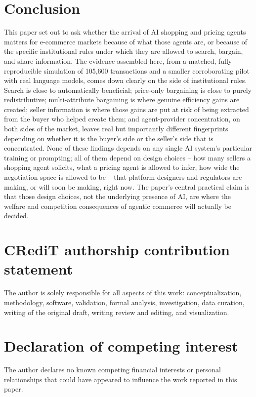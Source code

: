 \documentclass[review]{elsarticle}
\begin{document}
\section{Conclusion}
\label{sec:conclusion}

This paper set out to ask whether the arrival of AI shopping and pricing agents matters for e-commerce markets because of what those agents are, or because of the specific institutional rules under which they are allowed to search, bargain, and share information. The evidence assembled here, from a matched, fully reproducible simulation of 105,600 transactions and a smaller corroborating pilot with real language models, comes down clearly on the side of institutional rules. Search is close to automatically beneficial; price-only bargaining is close to purely redistributive; multi-attribute bargaining is where genuine efficiency gains are created; seller information is where those gains are put at risk of being extracted from the buyer who helped create them; and agent-provider concentration, on both sides of the market, leaves real but importantly different fingerprints depending on whether it is the buyer's side or the seller's side that is concentrated. None of these findings depends on any single AI system's particular training or prompting; all of them depend on design choices -- how many sellers a shopping agent solicits, what a pricing agent is allowed to infer, how wide the negotiation space is allowed to be -- that platform designers and regulators are making, or will soon be making, right now. The paper's central practical claim is that those design choices, not the underlying presence of AI, are where the welfare and competition consequences of agentic commerce will actually be decided.

\section*{CRediT authorship contribution statement}
The author is solely responsible for all aspects of this work: conceptualization, methodology, software, validation, formal analysis, investigation, data curation, writing of the original draft, writing review and editing, and visualization.

\section*{Declaration of competing interest}
The author declares no known competing financial interests or personal relationships that could have appeared to influence the work reported in this paper.
\end{document}
